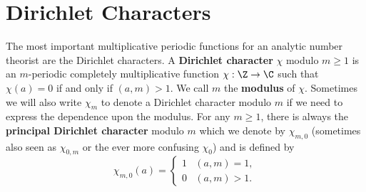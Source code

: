     \section{Dirichlet Characters}
      The most important multiplicative periodic functions for an analytic number theorist are the Dirichlet characters. A \textbf{Dirichlet character} $\chi$ modulo $m \ge 1$ is an $m$-periodic completely multiplicative function $\chi:\Z \to \C$ such that $\chi(a) = 0$ if and only if $(a,m) > 1$. We call $m$ the \textbf{modulus} of $\chi$. Sometimes we will also write $\chi_{m}$ to denote a Dirichlet character modulo $m$ if we need to express the dependence upon the modulus. For any $m \ge 1$, there is always the \textbf{principal Dirichlet character} modulo $m$ which we denote by $\chi_{m,0}$ (sometimes also seen as $\chi_{0,m}$ or the ever more confusing $\chi_{0}$) and is defined by
      \[
        \chi_{m,0}(a) = \begin{cases} 1 & (a,m) = 1, \\ 0 & (a,m) > 1. \end{cases}
      \]
